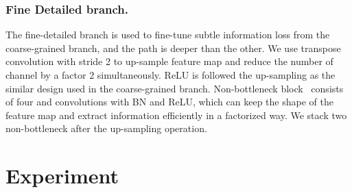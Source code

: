 \documentclass[letterpaper]{article} \usepackage{aaai21}  \usepackage{times}  \usepackage{helvet} \usepackage{courier}  \usepackage[hyphens]{url}  \usepackage{graphicx} \urlstyle{rm} \def\UrlFont{\rm}  \usepackage{natbib}  \usepackage{caption} \frenchspacing  \setlength{\pdfpagewidth}{8.5in}  \setlength{\pdfpageheight}{11in}  \usepackage{amsmath}
\begin{document}
\subsubsection{Fine Detailed branch.}
The fine-detailed branch is used to fine-tune subtle information loss from the coarse-grained branch, and the path is deeper than the other. We use transpose convolution with stride 2 to up-sample feature map and reduce the number of channel by a factor 2 simultaneously. ReLU is followed the up-sampling as the similar design used in the coarse-grained branch. Non-bottleneck block~\citep{romera2017erfnet} consists of four  and convolutions with BN and ReLU, which can keep the shape of the feature map and extract information efficiently in a factorized way. We stack two non-bottleneck after the up-sampling operation.

\section{Experiment}

\begin{table*}[]
\centering
{}
\caption{Comparison with state-of-the-art results on CULane dataset with IoU threshold = 0.5. For crossroad, only FP are shown. Res50 indicates deeplab~\citep{chen2017deeplab} using resnet50 as backbone.}
\label{culane_main}
\vspace{-8pt}
\end{table*}
\end{document}
